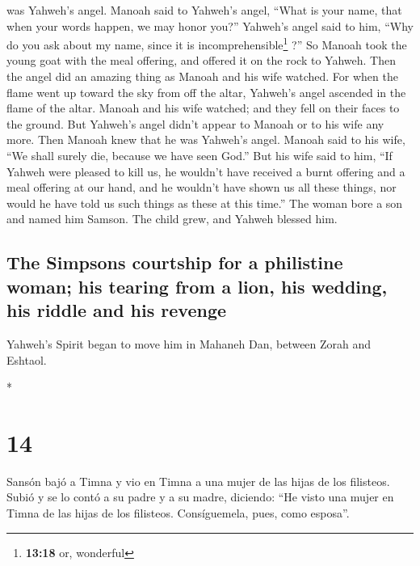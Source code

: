 \begin{paracol}{2}
\begin{otherlanguage}{english}
was Yahweh's angel.  Manoah said to Yahweh's angel,
``What is your name, that when your words happen, we may honor you?''
 Yahweh's angel said to him, ``Why do you ask about my
name, since it is incomprehensible\footnote{\textbf{13:18} or, wonderful}
?''  So Manoah took the young goat with the meal
offering, and offered it on the rock to Yahweh. Then the angel did an
amazing thing as Manoah and his wife watched.  For when
the flame went up toward the sky from off the altar, Yahweh's angel
ascended in the flame of the altar. Manoah and his wife watched; and
they fell on their faces to the ground.  But Yahweh's
angel didn't appear to Manoah or to his wife any more. Then Manoah knew
that he was Yahweh's angel.  Manoah said to his wife,
``We shall surely die, because we have seen God.''  But
his wife said to him, ``If Yahweh were pleased to kill us, he wouldn't
have received a burnt offering and a meal offering at our hand, and he
wouldn't have shown us all these things, nor would he have told us such
things as these at this time.''  The woman bore a son and
named him Samson. The child grew, and Yahweh blessed him.

\hypertarget{the-simpsons-courtship-for-a-philistine-woman-his-tearing-from-a-lion-his-wedding-his-riddle-and-his-revenge}{%
\subsection{The Simpsons courtship for a philistine woman; his tearing
from a lion, his wedding, his riddle and his
revenge}\label{the-simpsons-courtship-for-a-philistine-woman-his-tearing-from-a-lion-his-wedding-his-riddle-and-his-revenge}}

 Yahweh's Spirit began to move him in Mahaneh Dan,
between Zorah and Eshtaol.

\end{otherlanguage}

\switchcolumn[0]*

\hypertarget{section-26}{%
\section{14}\label{section-26}}

 Sansón bajó a Timna y vio en Timna a una mujer de las
hijas de los filisteos.  Subió y se lo contó a su padre y
a su madre, diciendo: ``He visto una mujer en Timna de las hijas de los
filisteos. Consíguemela, pues, como esposa''.


\end{paracol}
